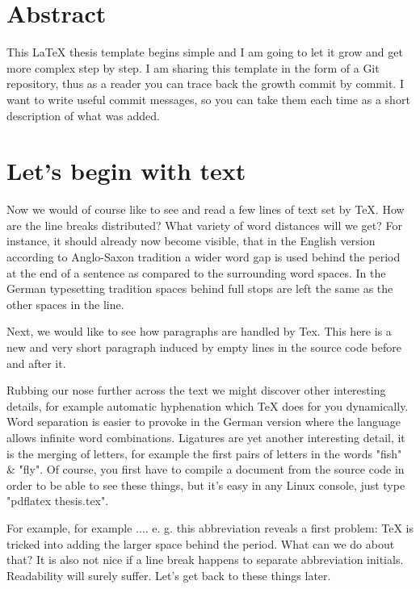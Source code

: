\documentclass[11pt,a4paper,twoside,titlepage]{book}
\begin{document}
\frontmatter
\chapter{Abstract}%
This LaTeX thesis template begins simple and I am going to let it grow and get more complex step by step. I am sharing this template in the form of a Git repository, thus as a reader you can trace back the growth commit by commit. I want to write useful commit messages, so you can take them each time as a short description of what was added.

\tableofcontents
\cleardoublepage


\mainmatter
\chapter{Let's begin with text}%
Now we would of course like to see and read a few lines of text set by TeX. How are the line breaks distributed? What variety of word distances will we get? For instance, it should already now become visible, that in the English version according to Anglo-Saxon tradition a wider word gap is used behind the period at the end of a sentence as compared to the surrounding word spaces. In the German typesetting tradition spaces behind full stops are left the same as the other spaces in the line.

Next, we would like to see how paragraphs are handled by Tex. This here is a new and very short paragraph induced by empty lines in the source code before and after it.

Rubbing our nose further across the text we might discover other interesting details, for example automatic hyphenation which TeX does for you dynamically. Word separation is easier to provoke in the German version where the language allows infinite word combinations. Ligatures are yet another interesting detail, it is the merging of letters, for example the first pairs of letters in the words "fish" \& "fly". Of course, you first have to compile a document from the source code in order to be able to see these things, but it's easy in any Linux console, just type "pdflatex thesis.tex".

For example, for example .... e. g. this abbreviation reveals a first problem: TeX is tricked into adding the larger space behind the period. What can we do about that? It is also not nice if a line break happens to separate abbreviation initials. Readability will surely suffer. Let's get back to these things later.
\end{document}
